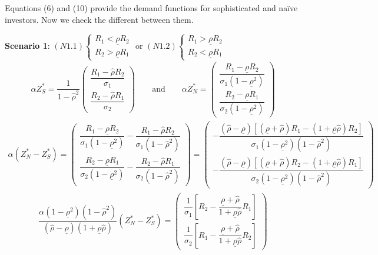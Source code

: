 \documentclass[10pt]{article}
\begin{document}
\quad 
Equations (6) and (10) provide the demand functions for sophisticated and na\"ive investors. Now we check the different between them.

{\bf Scenario 1}: $ (N1.1) \left\{ \begin{matrix} R_1 < \underline{\rho} R_2 \\ R_2 > \underline{\rho} R_1 \end{matrix} \right. $ or $ (N1.2) \left\{ \begin{matrix} R_1 > \underline{\rho} R_2 \\ R_2 < \underline{\rho} R_1 \end{matrix} \right. $
\begin{eqnarray*}
\alpha Z_S^* = \dfrac1{1 - {\hat \rho}^2} \left( \begin{matrix} \dfrac{R_1 - {\hat \rho} R_2}{\sigma_1} \\ \dfrac{R_2 - {\hat \rho} R_1}{\sigma_2} \end{matrix} \right) \qquad \text{and} \qquad \alpha Z_N^* = \left( \begin{matrix} \dfrac{R_1 - \underline{\rho} R_2}{\sigma_1 (1 - \underline{\rho}^2)} \\ \dfrac{R_2 - \underline{\rho} R_1}{\sigma_2 (1 - \underline{\rho}^2)} \end{matrix} \right)
\end{eqnarray*}
\begin{eqnarray*}
\alpha (Z_N^* - Z_S^*) = \left( \begin{matrix} \dfrac{R_1 - \underline{\rho} R_2}{\sigma_1 (1 - \underline{\rho}^2)} - \dfrac{R_1 - {\hat \rho} R_2}{\sigma_1 (1 - {\hat \rho}^2)} \\ \dfrac{R_2 - \underline{\rho} R_1}{\sigma_2 (1 - \underline{\rho}^2)} - \dfrac{R_2 - {\hat \rho} R_1}{\sigma_2 (1 - {\hat \rho}^2)} \end{matrix} \right) = \left( \begin{matrix} - \dfrac{({\hat \rho} - \underline{\rho}) [(\underline{\rho} + {\hat \rho}) R_1 - (1 + \underline{\rho} {\hat \rho}) R_2]}{\sigma_1 (1 - \underline{\rho}^2) (1 - {\hat \rho}^2)} \\ - \dfrac{({\hat \rho} - \underline{\rho}) [(\underline{\rho} + {\hat \rho}) R_2 - (1 + \underline{\rho} {\hat \rho}) R_1]}{\sigma_2 (1 - \underline{\rho}^2) (1 - {\hat \rho}^2)} \end{matrix} \right)
\end{eqnarray*}
\begin{eqnarray*}
\dfrac{\alpha (1 - \underline{\rho}^2) (1 - {\hat \rho}^2)}{({\hat \rho} - \underline{\rho}) (1 + \underline{\rho} {\hat \rho})} (Z_N^* - Z_S^*) = \left( \begin{matrix} \dfrac{1}{\sigma_1} \left[ R_2 - \dfrac{\underline{\rho} + {\hat \rho}}{1 + \underline{\rho} {\hat \rho}} R_1 \right] \\ \dfrac{1}{\sigma_2} \left[ R_1 - \dfrac{\underline{\rho} + {\hat \rho}}{1 + \underline{\rho} {\hat \rho}} R_2 \right] \end{matrix} \right)
\end{eqnarray*}
\end{document}
